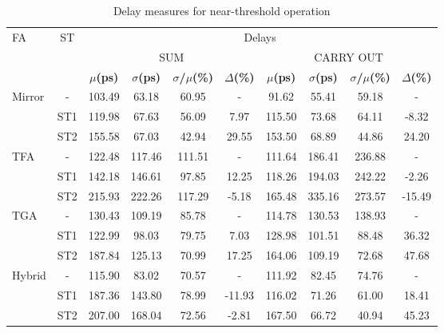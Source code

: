 \documentclass[pgmicro,mestrado,english]{iiufrgs}
\begin{document}
\begin{table}[]
\centering
\caption{Delay measures for near-threshold operation}
\label{delayNT}
\begin{tabular}{lccccccccc}
\hline
\multirow{3}{*}{FA} & \multirow{3}{*}{ST} & \multicolumn{8}{c}{Delays} \\ \cline{3-10}
& & \multicolumn{4}{c}{SUM} & \multicolumn{4}{c}{CARRY OUT} \\ \cline{3-10}
& & \textbf{$\mu$(ps)} & \textbf{$\sigma$(ps)} & \textbf{$\sigma$/$\mu$(\%)} & \textbf{$\Delta$(\%)} & \textbf{$\mu$(ps)} & \textbf{$\sigma$(ps)} & \textbf{$\sigma$/$\mu$(\%)} & \textbf{$\Delta$(\%)} \\ \hline
\multirow{3}{*}{Mirror} & - & 103.49 & 63.18 & 60.95 & - & 91.62 & 55.41 & 59.18 & - \\ \cline{2-10}
& ST1 & 119.98 & 67.63 & 56.09 & 7.97 & 115.50 & 73.68 & 64.11 & -8.32 \\ \cline{2-10}
& ST2 & 155.58 & 67.03 & 42.94 & 29.55 & 153.50 & 68.89 & 44.86 & 24.20 \\ \hline
\multirow{3}{*}{TFA} & - & 122.48 & 117.46 & 111.51 & - & 111.64 & 186.41 & 236.88 & - \\ \cline{2-10}
& ST1 & 142.18 & 146.61 & 97.85 & 12.25 & 118.26 & 194.03 & 242.22 & -2.26 \\ \cline{2-10}
& ST2 & 215.93 & 222.26 & 117.29 & -5.18 & 165.48 & 335.16 & 273.57 & -15.49 \\ \hline
\multirow{3}{*}{TGA} & - & 130.43 & 109.19 & 85.78 & - & 114.78 & 130.53 & 138.93 & - \\ \cline{2-10}
& ST1 & 122.99 & 98.03 & 79.75 & 7.03 & 128.98 & 101.51 & 88.48 & 36.32 \\ \cline{2-10}
& ST2 & 187.84 & 125.13 & 70.99 & 17.25 & 164.06 & 109.19 & 72.68 & 47.68 \\ \hline
\multirow{3}{*}{Hybrid} & - & 115.90 & 83.02 & 70.57 & - & 111.92 & 82.45 & 74.76 & - \\ \cline{2-10}
& ST1 & 187.36 & 143.80 & 78.99 & -11.93 & 116.02 & 71.26 & 61.00 & 18.41 \\ \cline{2-10}
& ST2 & 207.00 & 168.04 & 72.56 & -2.81 & 167.50 & 66.72 & 40.94 & 45.23 \\ \hline
\end{tabular}
\end{table}
\vspace{1em}
\end{document}
